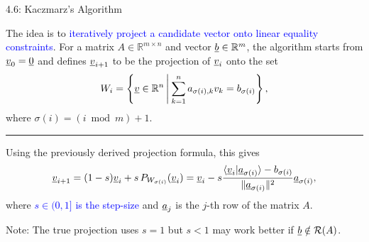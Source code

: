 \documentclass[10pt,english,aspectratio=169]{beamer}
\begin{document}
\begin{frame}{4.6: Kaczmarz's Algorithm}

The idea is to \textcolor{blue}{iteratively project a candidate vector onto linear equality constraints}. For a matrix $A\in\mathbb{R}^{m\times n}$ and vector $\underline b\in\mathbb{R}^{m}$, the algorithm starts from $\underline{v}_0 = \underline{0}$ and defines $\underline v_{i+1}$ to be the projection of $\underline v_{i}$ onto the set \vspace{-0.5mm}
\[
W_{i}=\left\{ \underline v\in\mathbb{R}^{n}\,\middle|\:\sum_{k=1}^{n}a_{\sigma(i),k}v_{k}=b_{\sigma(i)}\right\} ,
\]
where $\sigma(i)=(i\bmod m)+1$.
\vspace{3mm}

\hrule

\vspace{3mm}

Using the previously derived projection formula, this gives  \vspace{-0.5mm}
\begin{equation*}
\underline v_{i+1}= (1-s) \underline{v}_i + s \, P_{W_{\sigma(i)}} (\underline{v}_i) = \underline v_{i}- s \frac{\langle\underline v_{i}|\underline a_{\sigma(i)}\rangle-b_{\sigma(i)}}{\text{\ensuremath{\|}}\underline a_{\sigma(i)}\|^{2}}\underline a_{\sigma(i)},
\end{equation*}
where \textcolor{blue}{$s\in(0,1]$ is the step-size} and $\underline a_{j}$ is the $j$-th row of the matrix $A$. 

\vspace{5mm}
Note: The true projection uses $s=1$ but $s<1$ may work better if $\underline{b} \notin \mathcal{R}(A)$. 
\end{frame}
\end{document}

